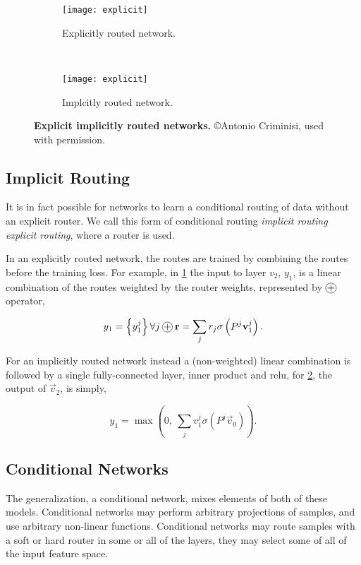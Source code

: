 \documentclass[thesis]{subfiles}
\begin{document}
	
	\begin{figure}[tbp] 
		\centering
		\begin{subfigure}[b]{0.45\textwidth}
			\centering
			\texttt{[image: explicit]}
			\caption{Explicitly routed network.}\label{fig:explicitRouter}
		\end{subfigure}
		~
		\begin{subfigure}[b]{0.45\textwidth}
			\centering
			\texttt{[image: explicit]}
			\caption{Implcitly routed network.}\label{fig:implicitRouter}
		\end{subfigure}
		\caption[Explicit \vs{}implicitly routed networks]{\textbf{Explicit \vs{}implicitly routed networks.} \copyright Antonio Criminisi, used with permission.}\label{fig:routerConnections}
	\end{figure}
	
	\subsection{Implicit Routing}
	It is in fact possible for networks to learn a conditional routing of data without an explicit router. We call this form of conditional routing \emph{implicit routing} \vs \emph{explicit routing}, where a router is used. 
	
	In an explicitly routed network, the routes are trained by combining the routes before the training loss. For example, in \cref{fig:explicitRouter} the input to layer $v_2$, $y_1$, is a linear combination of the routes weighted by the router weights, represented by $\circleplus$ operator,
	
	\begin{equation}
	y_1 = \left\{y_1^j\right\} \forall j\circleplus \vec r = \sum_j r_j \sigma\left(P^j \vec v_1^j \right).
	\end{equation}
	
	For an implicitly routed network instead a (non-weighted) linear combination is followed by a single fully-connected layer, \ie inner product and \gls{relu}, \ie for \cref{fig:implicitRouter}, the output of $\vec v_2$, is simply,
	
	\begin{equation}
	y_1 = \max \left(0, ~\sum_j v_1^j \sigma(P^j \vec v_0) \right).
	\end{equation}
	
	\subsection{Conditional Networks}
	The generalization, a conditional network, mixes elements of both of these models. Conditional networks may perform arbitrary projections of samples, and use arbitrary non-linear functions. Conditional networks may route samples with a soft or hard router in some or all of the layers, they may select some of all of the input feature space. 
	
\end{document}
